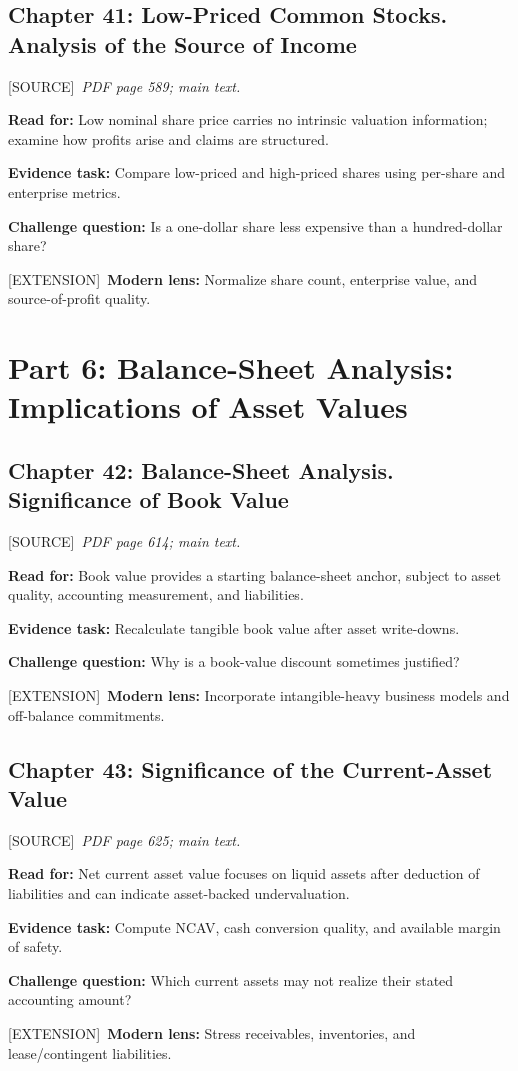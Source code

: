 \documentclass[11pt,letterpaper]{article}
\newcommand{\src}{\textsf{\color{sea}[SOURCE]}}
\newcommand{\ext}{\textsf{\color{gold}[EXTENSION]}}
\begin{document}
\subsection{Chapter 41: Low-Priced Common Stocks. Analysis of the Source of Income}
\src\ \textit{PDF page 589; main text.}\par
\textbf{Read for:} Low nominal share price carries no intrinsic valuation information; examine how profits arise and claims are structured.\par
\textbf{Evidence task:} Compare low-priced and high-priced shares using per-share and enterprise metrics.\par
\textbf{Challenge question:} Is a one-dollar share less expensive than a hundred-dollar share?\par
\ext\ \textbf{Modern lens:} Normalize share count, enterprise value, and source-of-profit quality.\par

\section{Part 6: Balance-Sheet Analysis: Implications of Asset Values}

\subsection{Chapter 42: Balance-Sheet Analysis. Significance of Book Value}
\src\ \textit{PDF page 614; main text.}\par
\textbf{Read for:} Book value provides a starting balance-sheet anchor, subject to asset quality, accounting measurement, and liabilities.\par
\textbf{Evidence task:} Recalculate tangible book value after asset write-downs.\par
\textbf{Challenge question:} Why is a book-value discount sometimes justified?\par
\ext\ \textbf{Modern lens:} Incorporate intangible-heavy business models and off-balance commitments.\par

\subsection{Chapter 43: Significance of the Current-Asset Value}
\src\ \textit{PDF page 625; main text.}\par
\textbf{Read for:} Net current asset value focuses on liquid assets after deduction of liabilities and can indicate asset-backed undervaluation.\par
\textbf{Evidence task:} Compute NCAV, cash conversion quality, and available margin of safety.\par
\textbf{Challenge question:} Which current assets may not realize their stated accounting amount?\par
\ext\ \textbf{Modern lens:} Stress receivables, inventories, and lease/contingent liabilities.\par
\end{document}
